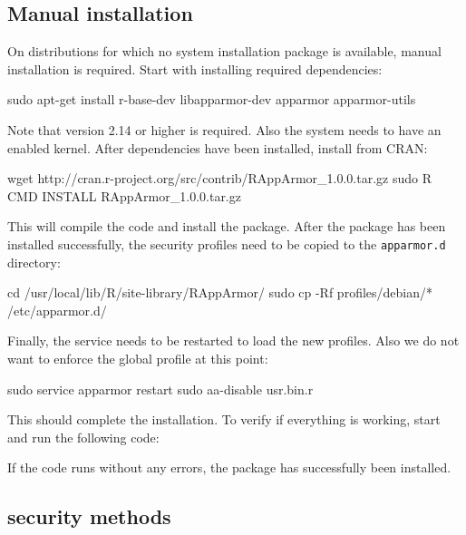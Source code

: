 \subsection{Manual installation}

On distributions for which no system installation package is available, manual
installation is required. Start with installing required dependencies:

\begin{codeblock}
sudo apt-get install r-base-dev libapparmor-dev apparmor apparmor-utils
\end{codeblock}

Note that \R version 2.14 or higher is required. Also the system needs to have
an \AppArmor enabled \Linux kernel. After dependencies have been installed,
install \RAppArmor from CRAN:

\begin{codeblock}
wget http://cran.r-project.org/src/contrib/RAppArmor_1.0.0.tar.gz
sudo R CMD INSTALL RAppArmor_1.0.0.tar.gz
\end{codeblock}

This will compile the  code and install the \R package. After the
package has been installed successfully, the security profiles need to be
copied to the \texttt{apparmor.d} directory:

\begin{codeblock}
cd /usr/local/lib/R/site-library/RAppArmor/
sudo cp -Rf profiles/debian/* /etc/apparmor.d/
\end{codeblock}

Finally, the \AppArmor service needs to be restarted to load the new profiles.
Also we do not want to enforce the global \R profile at this point:

\begin{codeblock}
sudo service apparmor restart
sudo aa-disable usr.bin.r
\end{codeblock}

This should complete the installation. To verify if everything is working, start
\R and run the following code:



If the code runs without any errors, the package has successfully been
installed. 

\subsection{\Linux security methods}

